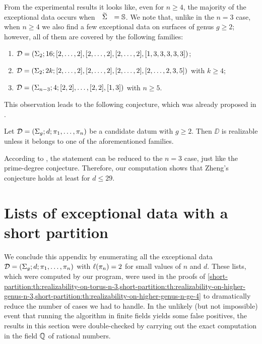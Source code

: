 From the experimental results it looks like, even for $n\ge 4$, the majority of the exceptional data occurs when $\tSigma=\sphere$. We note that, unlike in the $n=3$ case, when $n\ge 4$ we also find a few exceptional data on surfaces of genus $g\ge 2$; however,
all of them are covered by the following families:
\begin{enumerate}[(1)]
\item $\mathcal{D}=(\Sigma_{2};16;[2,\ldots,2],[2,\ldots,2],[2,\ldots,2],[1,3,3,3,3,3])$;
\item $\mathcal{D}=(\Sigma_{2};2k;[2,\ldots,2],[2,\ldots,2],[2,\ldots,2],[2,\ldots,2,3,5])$ with $k\ge 4$;
\item $\mathcal{D}=(\Sigma_{n-3};4;[2,2],\ldots,[2,2],[1,3])$ with $n\ge 5$.
\end{enumerate}
This observation leads to the following conjecture, which was already proposed in \cite{zheng}.
\begin{conjecture*}[Zheng]
Let $\mathcal{D}=(\Sigma_{g};d;\pi_1,\ldots,\pi_n)$ be a candidate datum with $g\ge 2$. Then $\DD$ is realizable unless it belongs to one of the aforementioned families.
\end{conjecture*}
According to \citeauthor{zheng}, the statement can be reduced to the $n=3$ case, just like the prime-degree conjecture. Therefore, our computation shows that Zheng's conjecture holds at least for $d\le 29$.

\section{Lists of exceptional data with a short partition}

We conclude this appendix by enumerating all the exceptional data $\mathcal{D}=(\Sigma_{g};d;\pi_1,\ldots,\pi_n)$ with $\ell(\pi_n)=2$ for small values of $n$ and $d$. These lists, which were computed by our \Cpp{} program, were used in the proofs of \cref{short-partition:th:realizability-on-torus-n-3,short-partition:th:realizability-on-higher-genus-n-3,short-partition:th:realizability-on-higher-genus-n-ge-4} to dramatically reduce the number of cases we had to handle. In the unlikely (but not impossible) event that running the algorithm in finite fields yields some false positives, the results in this section were double-checked by carrying out the exact computation in the field $\mathbb{Q}$ of rational numbers.

